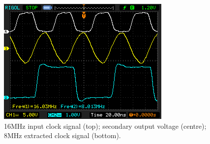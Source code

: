 \documentclass[conference]{IEEEtran}
\begin{document}
	\begin{figure}[t]
		\centering
		\includegraphics[width=0.8\columnwidth]{./img/Clock}
		\caption{16MHz input clock signal (top); secondary output voltage (centre); 8MHz extracted clock signal (bottom).}
		\label{fig:Clock}
	\end{figure}
	
\end{document}
